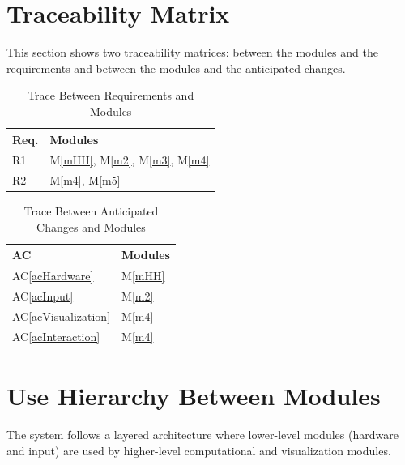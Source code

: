 \documentclass[12pt, titlepage]{article}
\newcommand{\acref}[1]{AC\ref{#1}}
\newcommand{\mref}[1]{M\ref{#1}}
\begin{document}
\section{Traceability Matrix} \label{SecTM}

This section shows two traceability matrices: between the modules and the
requirements and between the modules and the anticipated changes.

\begin{table}[H]
\centering
\begin{tabular}{p{} p{}}
\toprule
\textbf{Req.} & \textbf{Modules}\\
\midrule
R1 & \mref{mHH}, \mref{m2}, \mref{m3}, \mref{m4}\\
R2 & \mref{m4}, \mref{m5}\\
\bottomrule
\end{tabular}
\caption{Trace Between Requirements and Modules}
\label{TblRT}
\end{table}

\begin{table}[H]
\centering
\begin{tabular}{p{} p{}}
\toprule
\textbf{AC} & \textbf{Modules}\\
\midrule
\acref{acHardware} & \mref{mHH}\\
\acref{acInput} & \mref{m2}\\
\acref{acVisualization} & \mref{m4}\\
\acref{acInteraction} & \mref{m4}\\
\bottomrule
\end{tabular}
\caption{Trace Between Anticipated Changes and Modules}
\label{TblACT}
\end{table}

\section{Use Hierarchy Between Modules} \label{SecUse}

The system follows a layered architecture where lower-level modules (hardware and input) are used by higher-level computational and visualization modules.
\end{document}
